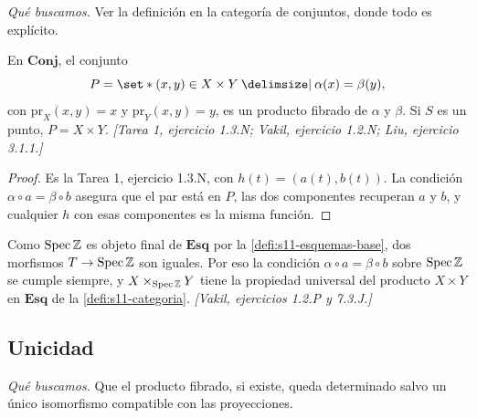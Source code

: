 \emph{Qué buscamos.} Ver la definición en la categoría de conjuntos, donde todo es explícito.

\begin{ejem}
\label{ejem:s11-producto-conjuntos}
En \(\mathbf{Conj}\), el conjunto
\[
 P=\set*{(x,y)\in X\times Y\given\alpha(x)=\beta(y)},
\]
con \(\mathrm{pr}_X(x,y)=x\) y \(\mathrm{pr}_Y(x,y)=y\), es un producto fibrado de \(\alpha\) y \(\beta\). Si \(S\) es un punto, \(P=X\times Y\). \emph{[Tarea 1, ejercicio 1.3.N; Vakil, ejercicio 1.2.N; Liu, ejercicio 3.1.1.]}
\end{ejem}
\begin{proof}
Es la Tarea 1, ejercicio 1.3.N, con \(h(t)=(a(t),b(t))\). La condición \(\alpha\circ a=\beta\circ b\) asegura que el par está en \(P\), las dos componentes recuperan \(a\) y \(b\), y cualquier \(h\) con esas componentes es la misma función.
\end{proof}

\begin{obs}
\label{obs:s11-producto-sobre-z}
Como \(\operatorname{Spec}\mathbb Z\) es objeto final de \(\mathbf{Esq}\) por la \cref{defi:s11-esquemas-base}, dos morfismos \(T\to\operatorname{Spec}\mathbb Z\) son iguales. Por eso la condición \(\alpha\circ a=\beta\circ b\) sobre \(\operatorname{Spec}\mathbb Z\) se cumple siempre, y \(X\times_{\operatorname{Spec}\mathbb Z}Y\) tiene la propiedad universal del producto \(X\times Y\) en \(\mathbf{Esq}\) de la \cref{defi:s11-categoria}. \emph{[Vakil, ejercicios 1.2.P y 7.3.J.]}
\end{obs}

\subsection{Unicidad}

\emph{Qué buscamos.} Que el producto fibrado, si existe, queda determinado salvo un único isomorfismo compatible con las proyecciones.

